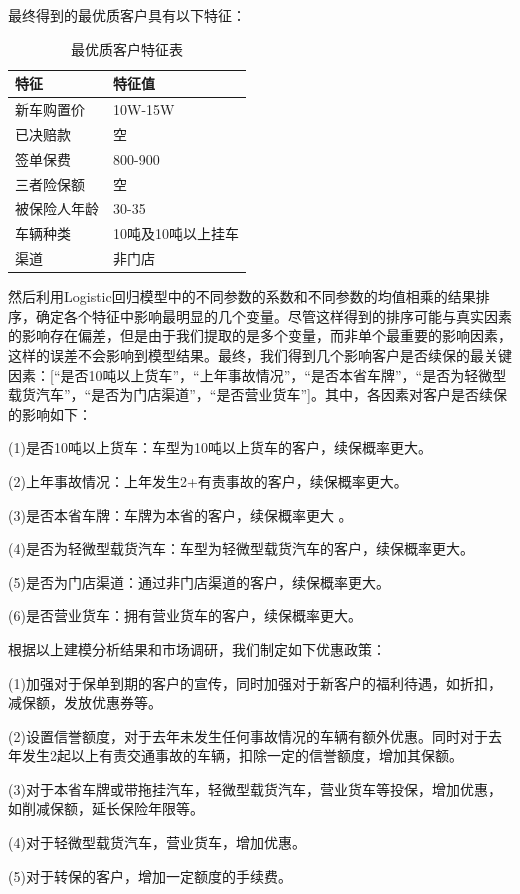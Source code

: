 \documentclass[UTF8,12pt,songti]{ctexart}
\begin{document}
\par 最终得到的最优质客户具有以下特征：\par
\begin{table}[H]
\centering
\begin{tabular}{|p{6cm} |p{6cm} | }%
\hline  %
特征&特征值 \\
\hline
新车购置价&10W-15W \\
\hline
已决赔款&空 \\
\hline
签单保费&800-900\\
\hline
三者险保额&空\\
\hline
被保险人年龄&30-35\\
\hline
车辆种类&10吨及10吨以上挂车\\
\hline
渠道&非门店\\
\hline %
\end{tabular}
\caption{最优质客户特征表}
\end{table}
\par
然后利用Logistic回归模型中的不同参数的系数和不同参数的均值相乘的结果排序，确定各个特征中影响最明显的几个变量。尽管这样得到的排序可能与真实因素的影响存在偏差，但是由于我们提取的是多个变量，而非单个最重要的影响因素，这样的误差不会影响到模型结果。最终，我们得到几个影响客户是否续保的最关键因素：[“是否10吨以上货车”，“上年事故情况”，“是否本省车牌”，“是否为轻微型载货汽车”，“是否为门店渠道”，“是否营业货车”]。其中，各因素对客户是否续保的影响如下：\par
(1)是否10吨以上货车：车型为10吨以上货车的客户，续保概率更大。\par
(2)上年事故情况：上年发生2+有责事故的客户，续保概率更大。\par
(3)是否本省车牌：车牌为本省的客户，续保概率更大 。\par
(4)是否为轻微型载货汽车：车型为轻微型载货汽车的客户，续保概率更大。\par
(5)是否为门店渠道：通过非门店渠道的客户，续保概率更大。\par
(6)是否营业货车：拥有营业货车的客户，续保概率更大。
\par
根据以上建模分析结果和市场调研，我们制定如下优惠政策：\par
(1)加强对于保单到期的客户的宣传，同时加强对于新客户的福利待遇，如折扣，减保额，发放优惠券等。\par
(2)设置信誉额度，对于去年未发生任何事故情况的车辆有额外优惠。同时对于去年发生2起以上有责交通事故的车辆，扣除一定的信誉额度，增加其保额。\par
(3)对于本省车牌或带拖挂汽车，轻微型载货汽车，营业货车等投保，增加优惠，如削减保额，延长保险年限等。\par
(4)对于轻微型载货汽车，营业货车，增加优惠。\par
(5)对于转保的客户，增加一定额度的手续费。
\end{document}
